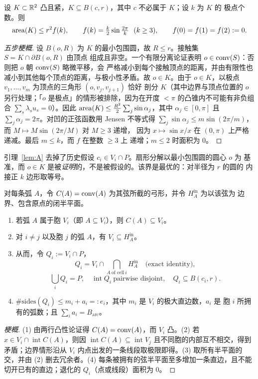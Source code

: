 \begin{lemma}\label{lem:A}
设 $K\subset\mathbb{R}^2$ 凸且紧，$K\subseteq B(c,r)$，其中 $c$ 不必属于 $K$；设 $k$ 为 $K$ 的
极点个数。则
\[
\operatorname{area}(K)\le r^2f(k),\qquad
f(k)=\tfrac k2\sin\tfrac{2\pi}k\ \ (k\ge3),\qquad f(0)=f(1)=f(2):=0 .
\]
\end{lemma}
\begin{proof}[五步梗概]
设 $B(o,R)$ 为 $K$ 的最小包围圆，故 $R\le r$。接触集 $S=K\cap\partial B(o,R)$ 由顶点
组成且非空。一个有限分离论证表明 $o\in\operatorname{conv}(S)$：否则把 $o$ 朝 $\operatorname{conv}(S)$ 略微平移，会
严格减小到每个接触顶点的距离，并由有限性也减小到其他每个顶点的距离，与极小性矛盾。故
$o\in K$。由于 $o\in K$，以极点 $v_1,\dots,v_m$ 为顶点的三角形 $(o,v_j,v_{j+1})$ 恰好
剖分 $K$（其中边界与顶点位置的 $o$ 另行处理；「$o$ 是极点」的情形被排除，因为在开度
$<\pi$ 的凸锥内不可能有非负组合 $\sum_s\lambda_su_s=0$）。因此
$\operatorname{area}(K)\le\frac{R^2}2\sum_j\sin\alpha_j$，其中 $\alpha_j\in[0,\pi]$ 且
$\sum_j\alpha_j=2\pi$。对凹的正弦函数用 Jensen 不等式得
$\sum_j\sin\alpha_j\le m\sin(2\pi/m)$，而 $M\mapsto M\sin(2\pi/M)$ 对 $M\ge3$ 递增，
因为 $x\mapsto\sin x/x$ 在 $(0,\pi)$ 上严格递减。最后 $m\le k$，而 $f$ 在整数 $\ge3$ 上
递增；$m\le2$ 时面积为 $0$。
\end{proof}

\begin{remark}
引理~\ref{lem:A} 去掉了历史假设 $c_i\in V_i\cap P$。扇形分解以最小包围圆的圆心 $o$ 为
基准，而 $o\in K$ 是被\emph{证明}的，不是被假设的。该界是最优的：对半径为 $r$ 的圆的
内接正 $k$ 边形取等号。
\end{remark}

\begin{lemma}[引理 B：帽属于它们自己的胞；$Q_i=V_i\cap P$ 精确成立]\label{lem:B}
对每条弧 $A$，令 $C(A)=\operatorname{conv}(A)$ 为其弦所截的弓形，并令 $H_A^{\mathrm{in}}$ 为以该弦为
边界、包含原点的闭半平面。
\begin{enumerate}[leftmargin=1.6em,itemsep=2pt]
\item 若弧 $A$ 属于胞 $V_i$（即 $A\subseteq V_i$），则 $C(A)\subseteq V_i$。
\item 对 $i\ne j$ 以及胞 $j$ 的弧 $A$，有 $V_i\subseteq H_A^{\mathrm{in}}$。
\item 从而，令 $Q_i:=V_i\cap P$，
\[
Q_i=V_i\cap\bigcap_{A\ \text{of cell}\ i}H_A^{\mathrm{in}}
\quad\text{(exact identity)},
\]
\[
\bigcup_iQ_i=P,\quad \operatorname{int}Q_i\ \text{pairwise disjoint},\quad Q_i\subseteq B(c_i,r).
\]
\item $\#\text{sides}(Q_i)\le m_i+a_i=:e_i$，其中 $m_i$ 是 $V_i$ 的极大直边数，$a_i$ 是
胞 $i$ 所拥有的弧数；且 $\sum_ia_i=B_{\mathrm{arc}}$。
\end{enumerate}
\end{lemma}
\begin{proof}[梗概]
(1) 由两行凸性论证得 $C(A)=\operatorname{conv}(A)$，而 $V_i$ 凸。(2) 若
$x\in V_i\cap\operatorname{int}C(A)$，则因
$\operatorname{int}C(A)\subseteq
\operatorname{int}V_j$ 且不同胞的内部互不相交，得到
矛盾；边界情形沿从 $V_i$ 内点出发的一条线段取极限即得。(3) 取所有半平面的交，并由 (2)
删去冗余者。(4) 每条被拥有的弦半平面至多增加一条直边，且不能切开已有的直边；退化的
$Q_i$（点或线段）面积为 $0$。
\end{proof}

